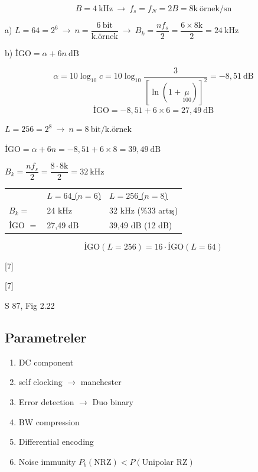 \documentclass[11pt,a4paper]{article}
\begin{document}
\[ B=4\ \mathrm{kHz}\ \longrightarrow\ f_s=f_N=2B=8\mathrm{k}\ \text{örnek/sn} \]

a) $L=64=2^6\ \longrightarrow\ n=\dfrac{6\ \mathrm{bit}}{\text{k.örnek}}\ \longrightarrow\ B_k=\dfrac{n f_s}{2}=\dfrac{6\times 8\mathrm{k}}{2}=24\ \mathrm{kHz}$

b) $\text{İGO}=\alpha+6n\ \mathrm{dB}$

\[ \alpha=10\log_{10}c=10\log_{10}\frac{3}{\left[\ln(1+\underset{100}{\mu})\right]^2}=-8{,}51\ \mathrm{dB} \]
\[ \text{İGO}=-8{,}51+6\times 6=27{,}49\ \mathrm{dB} \]

 $L=256=2^8\ \longrightarrow\ n=8\ \mathrm{bit}/\text{k.örnek}$

$\text{İGO}=\alpha+6n=-8{,}51+6\times 8=39{,}49\ \mathrm{dB}$

$B_k=\dfrac{n f_s}{2}=\dfrac{8\cdot 8\mathrm{k}}{2}=32\ \mathrm{kHz}$

\begin{center}
\begin{tabular}{lll}
 & \underline{$L=64$ ($n=6$)} & \underline{$L=256$ ($n=8$)}\\[2pt]
$B_k=$ & 24 kHz & 32 kHz \quad (\%33 artış)\\
İGO $=$ & 27,49 dB & 39,49 dB \quad (12 dB)
\end{tabular}
\end{center}

\[ \text{İGO}(L=256)=16\cdot\text{İGO}(L=64) \]

[7]

[7]

S 87, Fig 2.22

\subsection{Parametreler}
\begin{enumerate}[label=\arabic*)]
\item DC component
\item self clocking $\to$ manchester
\item Error detection $\to$ Duo binary
\item BW compression
\item Differential encoding
\item Noise immunity \quad $P_b(\mathrm{NRZ}) < P(\text{Unipolar RZ})$
\end{enumerate}

\end{document}
